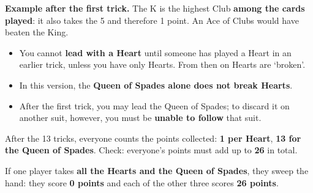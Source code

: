 \documentclass[10pt]{article}
\begin{document}
\begin{center}
\hfill
{}\hfill
{}\hfill
{}
\end{center}

\textbf{Example after the first trick.} The K\sC{} is the highest Club \textbf{among the cards played}: it also takes the 5\sH{} and therefore 1 point. An Ace of Clubs would have beaten the King.
\begin{itemize}
 \item You cannot \textbf{lead with a Heart} until someone has played a Heart in an earlier trick, unless you have only Hearts. From then on Hearts are ‘broken’.
 \item In this version, the \textbf{Queen of Spades alone does not break Hearts}.
 \item After the first trick, you may lead the Queen of Spades; to discard it on another suit, however, you must be \textbf{unable to follow} that suit.
\end{itemize}
After the 13 tricks, everyone counts the points collected: \textbf{1 per Heart}, \textbf{13 for the Queen of Spades}. Check: everyone’s points must add up to \textbf{26} in total.

If one player takes \textbf{all the Hearts and the Queen of Spades}, they sweep the hand: they score \textbf{0 points} and each of the other three scores \textbf{26 points}.
\end{document}
